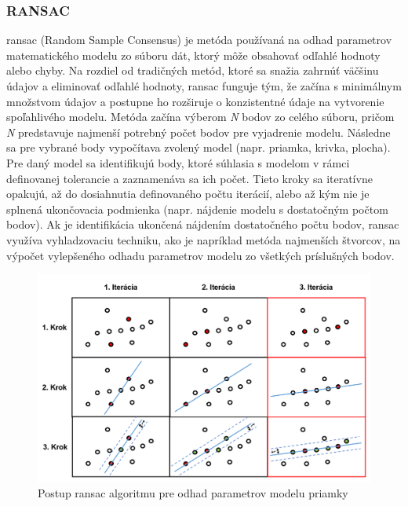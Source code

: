 \subsubsection{RANSAC}
\noindent \acrshort{ransac} (Random Sample Consensus) je metóda používaná na odhad parametrov matematického modelu zo súboru dát, ktorý môže obsahovať odľahlé hodnoty alebo chyby. Na rozdiel od tradičných metód, ktoré sa snažia zahrnúť väčšinu údajov a eliminovať odľahlé hodnoty, \acrshort{ransac} funguje tým, že začína s minimálnym množstvom údajov a postupne ho rozširuje o konzistentné údaje na vytvorenie spoľahlivého modelu. \cite{RANSAC_original}
\newline\indent Metóda začína výberom \textit{N} bodov zo celého súboru, pričom \textit{N} predstavuje najmenší potrebný počet bodov pre vyjadrenie modelu. Následne sa pre vybrané body vypočítava zvolený model (napr. priamka, krivka, plocha). Pre daný model sa identifikujú body, ktoré súhlasia s modelom v rámci definovanej tolerancie a zaznamenáva sa ich počet. Tieto kroky sa iteratívne opakujú, až do dosiahnutia definovaného počtu iterácií, alebo až kým nie je splnená ukončovacia podmienka (napr. nájdenie modelu s dostatočným počtom bodov). Ak je identifikácia ukončená nájdením dostatočného počtu bodov, \acrshort{ransac} využíva vyhladzovaciu techniku, ako je napríklad metóda najmenších štvorcov, na výpočet vylepšeného odhadu parametrov modelu zo všetkých príslušných bodov. \cite{RANSAC_original}
\begin{figure}[!htbp]
  \centering
  \includegraphics[width=16cm]{img/ransac_img.png}
  \caption{Postup \acrshort{ransac} algoritmu pre odhad parametrov modelu priamky}
  \label{ransac}
\end{figure} 

